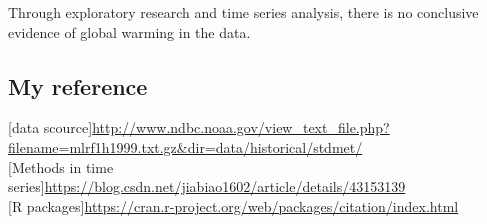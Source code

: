 \documentclass[]{article}
\begin{document}
Through exploratory research and time series analysis, there is no
conclusive evidence of global warming in the data.

\hypertarget{my-reference}{%
\subsection{My reference}\label{my-reference}}

{[}data
scource{]}\url{http://www.ndbc.noaa.gov/view_text_file.php?filename=mlrf1h1999.txt.gz\&dir=data/historical/stdmet/}\\
{[}Methods in time
series{]}\url{https://blog.csdn.net/jiabiao1602/article/details/43153139}\\
{[}R
packages{]}\url{https://cran.r-project.org/web/packages/citation/index.html}
\end{document}
